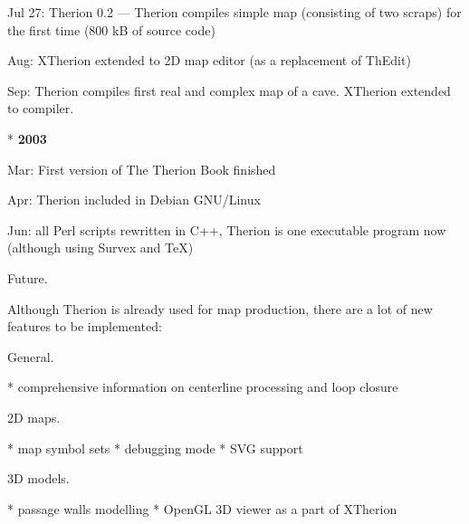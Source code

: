  Jul 27: Therion 0.2 ---
       Therion compiles simple map (consisting of two scraps)
       for the first time (800 kB of source code)

  Aug: XTherion extended to 2D map editor (as a replacement of ThEdit)

  Sep: Therion compiles first real and complex map of a cave. XTherion
       extended to compiler.


* {\bf 2003}

  Mar: First version of The Therion Book finished

  Apr: Therion included in Debian GNU/Linux

  Jun: all Perl scripts rewritten in C++, Therion is one executable program
       now (although using Survex and TeX)
\endlist


\subchapter Future.

Although Therion is already used for map production, there are a lot of 
new features to be implemented:

\subsubchapter General.

\list
* comprehensive information on centerline processing and loop closure
\endlist

\subsubchapter 2D maps.

\list
* map symbol sets
* debugging mode
* SVG support
\endlist


\subsubchapter 3D models.

\list
* passage walls modelling
* OpenGL 3D viewer as a part of XTherion
\endlist

\endinput
